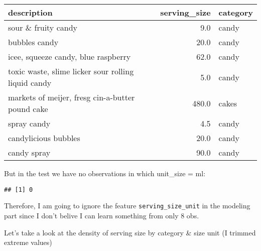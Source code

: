 \documentclass[
]{article}
\newenvironment{Shaded}{\begin{snugshade}}{\end{snugshade}}
\newcommand{\KeywordTok}[1]{\textcolor[rgb]{0.13,0.29,0.53}{\textbf{#1}}}
\newcommand{\NormalTok}[1]{#1}
\newcommand{\OperatorTok}[1]{\textcolor[rgb]{0.81,0.36,0.00}{\textbf{#1}}}
\newcommand{\StringTok}[1]{\textcolor[rgb]{0.31,0.60,0.02}{#1}}
\begin{document}
\begin{table}[H]
\centering\begingroup\fontsize{8}{10}\selectfont

\begin{tabular}{lrl}
\toprule
description & serving\_size & category\\
\midrule
\rowcolor{gray!6}  sour \& fruity candy & 9.0 & candy\\
bubbles candy & 20.0 & candy\\
\rowcolor{gray!6}  icee, squeeze candy, blue raspberry & 62.0 & candy\\
toxic waste, slime licker sour rolling liquid candy & 5.0 & candy\\
\rowcolor{gray!6}  markets of meijer, fresg cin-a-butter pound cake & 480.0 & cakes\\
\addlinespace
spray candy & 4.5 & candy\\
\rowcolor{gray!6}  candylicious bubbles & 20.0 & candy\\
candy spray & 90.0 & candy\\
\bottomrule
\end{tabular}
\endgroup{}
\end{table}

But in the test we have no observations in which unit\_size = ml:

\begin{Shaded}
\end{Shaded}

\begin{verbatim}
## [1] 0
\end{verbatim}

Therefore, I am going to ignore the feature \texttt{serving\_size\_unit}
in the modeling part since I don't belive I can learn something from
only 8 obs.

Let's take a look at the density of serving size by category \& size
unit (I trimmed extreme values)
\end{document}
